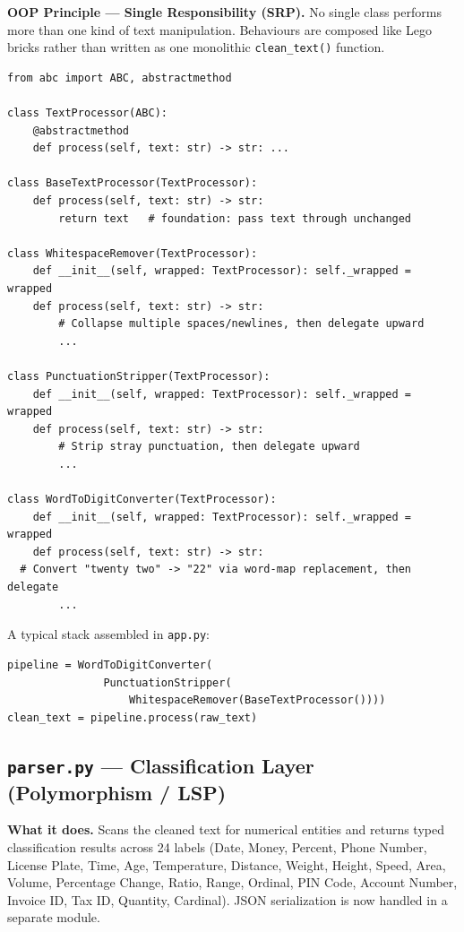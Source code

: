 \documentclass[12pt, a4paper]{article}
\begin{document}
\begin{mdframed}[style=patternbox]
\textbf{OOP Principle --- Single Responsibility (SRP).} No single class
performs more than one kind of text manipulation. Behaviours are composed
like Lego bricks rather than written as one monolithic \texttt{clean\_text()}
function.
\end{mdframed}
 
\begin{lstlisting}[caption={normalization.py --- interface and decorator skeleton}]
from abc import ABC, abstractmethod
 
class TextProcessor(ABC):
    @abstractmethod
    def process(self, text: str) -> str: ...
 
class BaseTextProcessor(TextProcessor):
    def process(self, text: str) -> str:
        return text   # foundation: pass text through unchanged
 
class WhitespaceRemover(TextProcessor):
    def __init__(self, wrapped: TextProcessor): self._wrapped = wrapped
    def process(self, text: str) -> str:
        # Collapse multiple spaces/newlines, then delegate upward
        ...
 
class PunctuationStripper(TextProcessor):
    def __init__(self, wrapped: TextProcessor): self._wrapped = wrapped
    def process(self, text: str) -> str:
        # Strip stray punctuation, then delegate upward
        ...
 
class WordToDigitConverter(TextProcessor):
    def __init__(self, wrapped: TextProcessor): self._wrapped = wrapped
    def process(self, text: str) -> str:
  # Convert "twenty two" -> "22" via word-map replacement, then delegate
        ...
\end{lstlisting}
 
A typical stack assembled in \texttt{app.py}:
\begin{lstlisting}[numbers=none]
pipeline = WordToDigitConverter(
               PunctuationStripper(
                   WhitespaceRemover(BaseTextProcessor())))
clean_text = pipeline.process(raw_text)
\end{lstlisting}
 
\subsection{\texttt{parser.py} --- Classification Layer (Polymorphism / LSP)}
 
\textbf{What it does.} Scans the cleaned text for numerical entities and
returns typed classification results across 24 labels (Date, Money, Percent,
Phone Number, License Plate, Time, Age, Temperature, Distance, Weight,
Height, Speed, Area, Volume, Percentage Change, Ratio, Range, Ordinal,
PIN Code, Account Number, Invoice ID, Tax ID, Quantity, Cardinal).
JSON serialization is now handled in a separate module.
 
\end{document}
